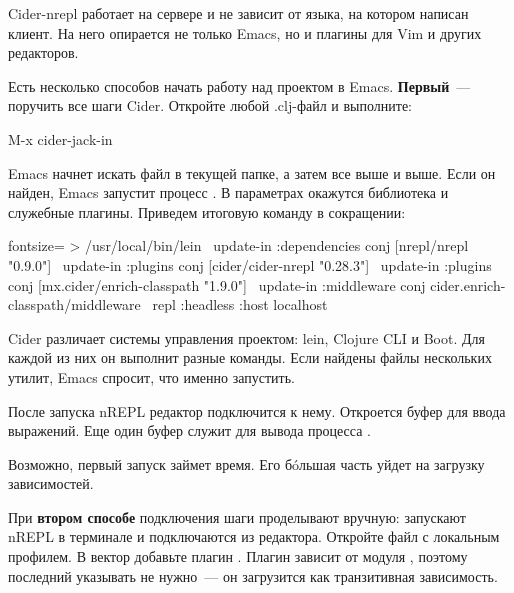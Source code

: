 Cider-nrepl работает на сервере и не зависит от языка, на котором написан клиент. На него опирается не только Emacs, но и плагины для Vim и других редакторов.

Есть несколько способов начать работу над проектом в Emacs. \textbf{Первый}~--- поручить все шаги Cider. Откройте любой .clj-файл и выполните:

\begin{english}
  \begin{text}
M-x cider-jack-in
  \end{text}
\end{english}

Emacs начнет искать файл  в текущей папке, а затем все выше и выше. Если он найден, Emacs запустит процесс . В параметрах окажутся библиотека  и служебные плагины. Приведем итоговую команду в сокращении:

\begin{english}
  \begin{bash*}{fontsize=\small}
> /usr/local/bin/lein \
  update-in :dependencies conj [nrepl/nrepl "0.9.0"] \
  update-in :plugins conj [cider/cider-nrepl "0.28.3"] \
  update-in :plugins conj [mx.cider/enrich-classpath "1.9.0"] \
  update-in :middleware conj cider.enrich-classpath/middleware \
  repl :headless :host localhost
  \end{bash*}
\end{english}

Cider различает системы управления проектом: lein, Clojure CLI и Boot. Для каждой из них он выполнит разные команды. Если найдены файлы нескольких утилит, Emacs спросит, что именно запустить.

После запуска nREPL редактор подключится к нему. Откроется буфер  для ввода выражений. Еще один буфер  служит для вывода процесса .

Возможно, первый запуск  займет время. Его бóльшая часть уйдет на загрузку зависимостей.

При \textbf{втором способе} подключения шаги проделывают вручную: запускают nREPL в терминале и подключаются из редактора. Откройте файл  с локальным профилем. В вектор  \arr {} добавьте плагин . Плагин зависит от модуля , поэтому последний указывать не нужно~--- он загрузится как транзитивная зависимость.

